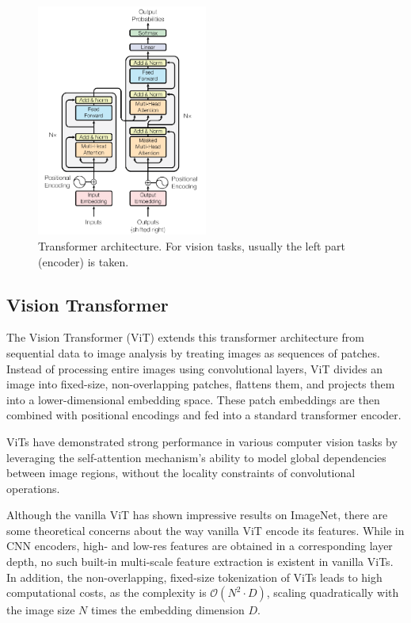 \begin{figure}[!ht]
    \centering
    \includegraphics[width=0.5\textwidth]{Images/SOTA/transformer.png}
    \caption{Transformer architecture. For vision tasks, usually the left part (encoder) is taken.}
    \label{fig:transformer}
\end{figure}

\subsection{Vision Transformer}

The Vision Transformer (ViT) extends this transformer architecture from sequential data to image analysis by treating images as sequences of patches.
Instead of processing entire images using convolutional layers, ViT divides an image into fixed-size, non-overlapping patches, flattens them, and projects them into a lower-dimensional embedding space. These patch embeddings are then combined with positional encodings and fed into a standard transformer encoder.

ViTs have demonstrated strong performance in various computer vision tasks by leveraging the self-attention mechanism’s ability to model global dependencies between image regions, without the locality constraints of convolutional operations.

Although the vanilla ViT has shown impressive results on ImageNet, there are some theoretical concerns about the way vanilla ViT encode its features. 
While in CNN encoders, high- and low-res features are obtained in a corresponding layer depth, no such built-in multi-scale feature extraction is existent in vanilla ViTs. In addition, the non-overlapping, fixed-size tokenization of ViTs leads to high computational costs, as the complexity is $\mathcal{O}(N^2 \cdot D)$, scaling quadratically with the image size $N$ times the embedding dimension $D$.

